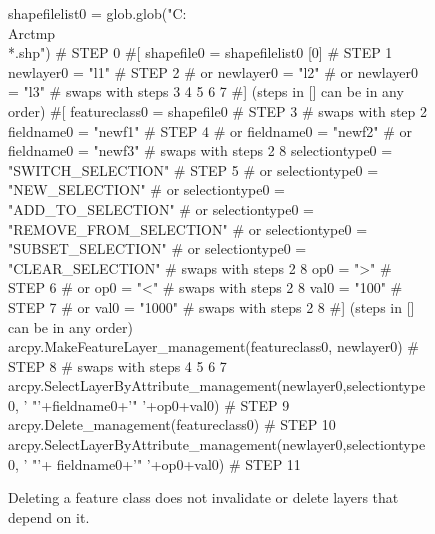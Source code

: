 \begin{figure}
{\scriptsize 
\begin{code}
shapefilelist0 = glob.glob("C:\\Arctmp\\*.shp")                                           \textcolor{black!60}{\# STEP 0}
\textcolor{black!60}{\#[}
shapefile0 = shapefilelist0 [0]                                           \textcolor{black!60}{\# STEP 1}
newlayer0 = "l1"                                                          \textcolor{black!60}{\# STEP 2}
\textcolor{black!60}{\#  or newlayer0 = "l2" }
\textcolor{black!60}{\#  or newlayer0 = "l3" }
\textcolor{black!60}{\#  swaps with steps 3 4 5 6 7}
\textcolor{black!60}{\#] (steps in [] can be in any order)}
\textcolor{black!60}{\#[}
featureclass0 = shapefile0                                                \textcolor{black!60}{\# STEP 3}
\textcolor{black!60}{\#  swaps with step 2}
fieldname0 = "newf1"                                                      \textcolor{black!60}{\# STEP 4}
\textcolor{black!60}{\#  or fieldname0 = "newf2" }
\textcolor{black!60}{\#  or fieldname0 = "newf3" }
\textcolor{black!60}{\#  swaps with steps 2 8}
selectiontype0 = "SWITCH\_SELECTION"                                       \textcolor{black!60}{\# STEP 5}
\textcolor{black!60}{\#  or selectiontype0 = "NEW\_SELECTION" }
\textcolor{black!60}{\#  or selectiontype0 = "ADD\_TO\_SELECTION" }
\textcolor{black!60}{\#  or selectiontype0 = "REMOVE\_FROM\_SELECTION"}
\textcolor{black!60}{\#  or selectiontype0 = "SUBSET\_SELECTION"}
\textcolor{black!60}{\#  or selectiontype0 = "CLEAR\_SELECTION"   }
\textcolor{black!60}{\#  swaps with steps 2 8}
op0 = ">"                                                                 \textcolor{black!60}{\# STEP 6}
\textcolor{black!60}{\#  or op0 = "<" }
\textcolor{black!60}{\#  swaps with steps 2 8}
val0 = "100"                                                              \textcolor{black!60}{\# STEP 7}
\textcolor{black!60}{\#  or val0 = "1000" }
\textcolor{black!60}{\#  swaps with steps 2 8}
\textcolor{black!60}{\#] (steps in [] can be in any order)}
arcpy.MakeFeatureLayer\_management(featureclass0, newlayer0)                                             \textcolor{black!60}{\# STEP 8}
\textcolor{black!60}{\#  swaps with steps 4 5 6 7}
arcpy.SelectLayerByAttribute\_management(newlayer0,selectiontype0,
   ' "'+fieldname0+'" '+op0+val0)                                         \textcolor{black!60}{\# STEP 9}
arcpy.Delete\_management(featureclass0)                                    \textcolor{black!60}{\# STEP 10}
arcpy.SelectLayerByAttribute\_management(newlayer0,selectiontype0,
   ' "'+ fieldname0+'" '+op0+val0)                                        \textcolor{black!60}{\# STEP 11}
\end{code}
}
\caption{Deleting a feature class does not invalidate or delete layers that depend on it.}
\label{fault1}
\end{figure}

